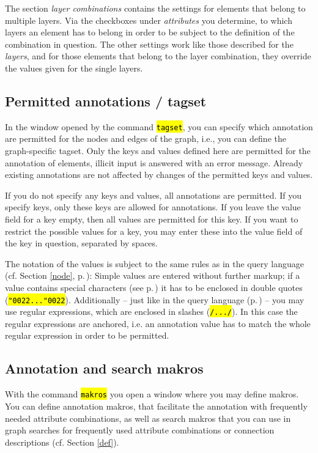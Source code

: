 \documentclass[12pt]{scrartcl}
\newcommand{\quo}{\char"0022}
\newcommand{\code}[1]{\hl{\texttt{#1}}}
\begin{document}
The section \textit{layer combinations} contains the settings for elements that belong to multiple layers.
Via the checkboxes under \textit{attributes} you determine, to which layers an element has to belong in order to be subject to the definition of the combination in question.
The other settings work like those described for the \textit{layers}, and for those elements that belong to the layer combination, they override the values given for the single layers.


\subsection{Permitted annotations / tagset}\label{erlaubteannotationen}

In the window opened by the command \code{tagset}, you can specify which annotation are permitted for the nodes and edges of the graph, i.e., you can define the graph-specific tagset.
Only the keys and values defined here are permitted for the annotation of elements, illicit input is answered with an error message.
Already existing annotations are not affected by changes of the permitted keys and values.

If you do not specify any keys and values, all annotations are permitted.
If you specify keys, only these keys are allowed for annotations.
If you leave the value field for a key empty, then all values are permitted for this key.
If you want to restrict the possible values for a key, you may enter these into the value field of the key in question, separated by spaces.

The notation of the values is subject to the same rules as in the query language (cf. Section \ref{node}, p.\,\pageref{zeichenketten}):
Simple values are entered without further markup; if a value contains special characters (see p.\,\pageref{zeichenketten}) it has to be enclosed in double quotes (\code{\quo...\quo}).
Additionally – just like in the query language (p.\,\pageref{zeichenketten}) – you may use regular expressions, which are enclosed in slashes (\code{/.../}).
In this case the regular expressions are anchored, i.e. an annotation value has to match the whole regular expression in order to be permitted.


\subsection{Annotation and search makros}\label{annotationsmakros}

With the command \code{makros} you open a window where you may define makros.
You can define annotation makros, that facilitate the annotation with frequently needed attribute combinations, as well as search makros that you can use in graph searches for frequently used attribute combinations or connection descriptions (cf. Section \ref{def}).
\end{document}
